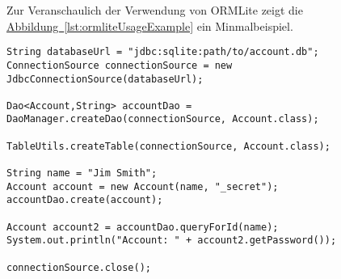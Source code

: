 Zur Veranschaulich der Verwendung von ORMLite zeigt die \hyperref[lst:ormliteUsageExample]{Abbildung~\ref{lst:ormliteUsageExample}} ein Minmalbeispiel.
\begin{lstlisting}[style=lstStyleFramed, caption={[Beispiel: Verwendung von ORMLite\protect\footnote{verändert nach \cite{ormlite}}] Beispiel: Verwendung von ORMLite\protect\footnotemark}, label=lst:ormliteUsageExample]
String databaseUrl = "jdbc:sqlite:path/to/account.db";
ConnectionSource connectionSource = new JdbcConnectionSource(databaseUrl);

Dao<Account,String> accountDao = DaoManager.createDao(connectionSource, Account.class);

TableUtils.createTable(connectionSource, Account.class);

String name = "Jim Smith";
Account account = new Account(name, "_secret");
accountDao.create(account);

Account account2 = accountDao.queryForId(name);
System.out.println("Account: " + account2.getPassword());

connectionSource.close();
\end{lstlisting}
